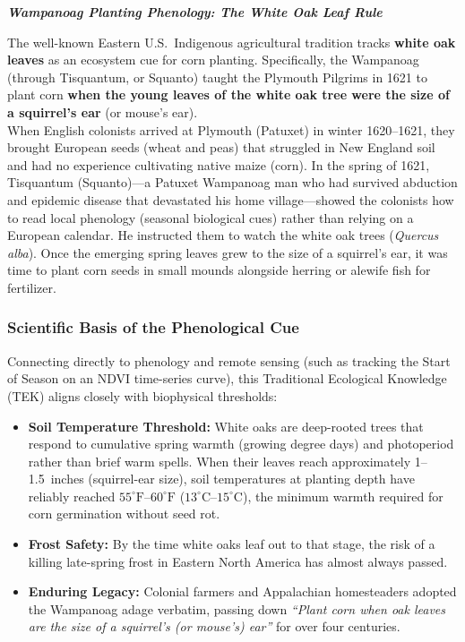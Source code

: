 \documentclass[12pt, letterpaper]{article}
\begin{document}
\bigskip
\LARGE
\begin{flushleft}
\textbf{\textit{Wampanoag Planting Phenology: The White Oak Leaf Rule}}
\end{flushleft}
\normalsize

The well-known Eastern U.S.\ Indigenous agricultural tradition tracks \textbf{white oak leaves} as an ecosystem cue for corn planting. Specifically, the Wampanoag (through Tisquantum, or Squanto) taught the Plymouth Pilgrims in 1621 to plant corn \textbf{when the young leaves of the white oak tree were the size of a squirrel's ear} (or mouse's ear).\\

When English colonists arrived at Plymouth (Patuxet) in winter 1620--1621, they brought European seeds (wheat and peas) that struggled in New England soil and had no experience cultivating native maize (corn). In the spring of 1621, Tisquantum (Squanto)---a Patuxet Wampanoag man who had survived abduction and epidemic disease that devastated his home village---showed the colonists how to read local phenology (seasonal biological cues) rather than relying on a European calendar. He instructed them to watch the white oak trees (\textit{Quercus alba}). Once the emerging spring leaves grew to the size of a squirrel's ear, it was time to plant corn seeds in small mounds alongside herring or alewife fish for fertilizer.


\subsubsection*{Scientific Basis of the Phenological Cue}
Connecting directly to phenology and remote sensing (such as tracking the Start of Season on an NDVI time-series curve), this Traditional Ecological Knowledge (TEK) aligns closely with biophysical thresholds:
\begin{itemize}
    \item \textbf{Soil Temperature Threshold:} White oaks are deep-rooted trees that respond to cumulative spring warmth (growing degree days) and photoperiod rather than brief warm spells. When their leaves reach approximately 1--1.5~inches (squirrel-ear size), soil temperatures at planting depth have reliably reached $55^\circ\text{F}$--$60^\circ\text{F}$ ($13^\circ\text{C}$--$15^\circ\text{C}$), the minimum warmth required for corn germination without seed rot.
    \item \textbf{Frost Safety:} By the time white oaks leaf out to that stage, the risk of a killing late-spring frost in Eastern North America has almost always passed.
    \item \textbf{Enduring Legacy:} Colonial farmers and Appalachian homesteaders adopted the Wampanoag adage verbatim, passing down \textit{``Plant corn when oak leaves are the size of a squirrel's (or mouse's) ear''} for over four centuries.
\end{itemize}
\end{document}
